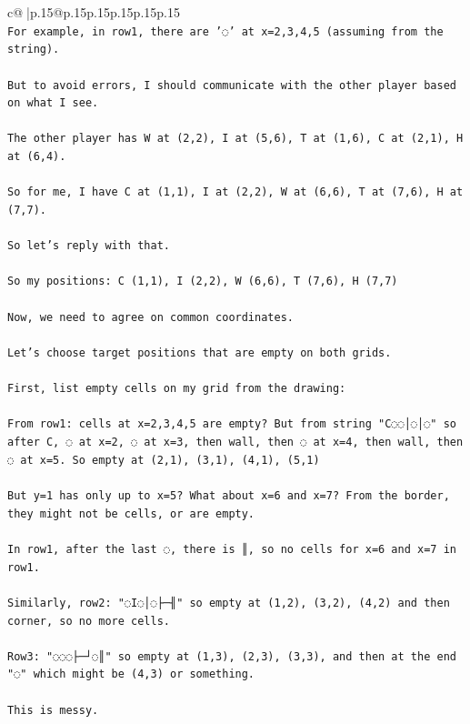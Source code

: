 \documentclass{article}
\begin{document}
{\begin{supertabular}{c@{$\;$}|p{.15\linewidth}@{}p{.15\linewidth}p{.15\linewidth}p{.15\linewidth}p{.15\linewidth}p{.15\linewidth}}
{{{\\ 
\texttt{For example, in row1, there are '◌' at x=2,3,4,5 (assuming from the string).} \\
\\ 
\texttt{But to avoid errors, I should communicate with the other player based on what I see.} \\
\\ 
\texttt{The other player has W at (2,2), I at (5,6), T at (1,6), C at (2,1), H at (6,4).} \\
\\ 
\texttt{So for me, I have C at (1,1), I at (2,2), W at (6,6), T at (7,6), H at (7,7).} \\
\\ 
\texttt{So let's reply with that.} \\
\\ 
\texttt{So my positions: C (1,1), I (2,2), W (6,6), T (7,6), H (7,7)} \\
\\ 
\texttt{Now, we need to agree on common coordinates.} \\
\\ 
\texttt{Let's choose target positions that are empty on both grids.} \\
\\ 
\texttt{First, list empty cells on my grid from the drawing:} \\
\\ 
\texttt{From row1: cells at x=2,3,4,5 are empty? But from string "C◌◌│◌│◌" so after C, ◌ at x=2, ◌ at x=3, then wall, then ◌ at x=4, then wall, then ◌ at x=5. So empty at (2,1), (3,1), (4,1), (5,1)} \\
\\ 
\texttt{But y=1 has only up to x=5? What about x=6 and x=7? From the border, they might not be cells, or are empty.} \\
\\ 
\texttt{In row1, after the last ◌, there is ║, so no cells for x=6 and x=7 in row1.} \\
\\ 
\texttt{Similarly, row2: "◌I◌│◌├─╢" so empty at (1,2), (3,2), (4,2) and then corner, so no more cells.} \\
\\ 
\texttt{Row3: "◌◌◌├─┘◌║" so empty at (1,3), (2,3), (3,3), and then at the end "◌" which might be (4,3) or something.} \\
\\ 
\texttt{This is messy.} \\
\\ 
}}}
\end{supertabular}}
\end{document}
